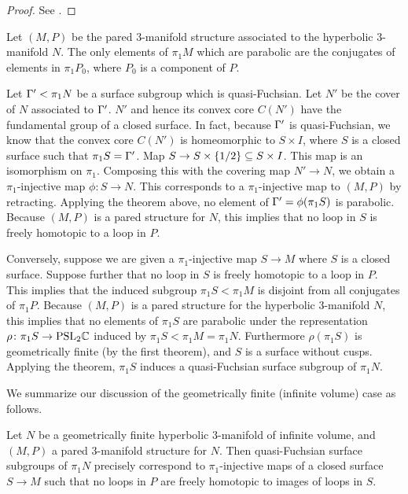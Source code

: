 \begin{proof}

See \cite[Proposition 7.1]{Mo}. %

\end{proof}


Let $(M,P)$ be the pared $3$-manifold structure associated to the hyperbolic
$3$-manifold $N$. The only elements of $\pi_1M$ which are parabolic are the
conjugates of elements in $\pi_1P_0$, where $P_0$ is a component of $P$.

Let $\Gamma' < \pi_1N$ be a surface subgroup which is quasi-Fuchsian. Let $N'$ be
the cover of $N$ associated to $\Gamma'$. $N'$ and hence its convex core $C(N')$
have the fundamental group of a closed surface. In fact, because $\Gamma'$ is
quasi-Fuchsian, we know that the convex core $C(N')$ is homeomorphic to $S
\times I$, where $S$ is a closed surface such that $\pi_1S = \Gamma'$.  Map $S \to
S \times \{1/2\} \subseteq S \times I$. This map is an isomorphism on $\pi_1$.
Composing this with the covering map $N' \to N$, we obtain a $\pi_1$-injective
map $\phi \colon S \to N$.  This corresponds to a $\pi_1$-injective map to
$(M,P)$ by retracting.  Applying the theorem above, no element of
$\Gamma'=\phi(\pi_1S)$ is parabolic.  Because $(M,P)$ is a pared structure for
$N$, this implies that no loop in $S$ is freely homotopic to a loop in $P$.

Conversely, suppose we are given a $\pi_1$-injective map $S \to M$ where $S$ is
a closed surface.  Suppose further that no loop in $S$ is freely homotopic to
a loop in $P$.  This implies that the induced subgroup $\pi_1S < \pi_1M$ is
disjoint from all conjugates of $\pi_1P$.  Because $(M,P)$ is a pared structure
for the hyperbolic $3$-manifold $N$, this implies that no elements of $\pi_1S$
are parabolic under the representation $\rho \colon \pi_1S \to \mathrm{PSL}_2\mathbb{C}$
induced by $\pi_1S < \pi_1M=\pi_1N$.  Furthermore $\rho(\pi_1S)$ is
geometrically finite (by the first theorem), and $S$ is a surface without
cusps.  Applying the theorem, $\pi_1S$ induces a quasi-Fuchsian surface
subgroup of $\pi_1N$.

We summarize our discussion of the geometrically finite (infinite volume) case
as follows.

\begin{prop}

Let $N$ be a geometrically finite hyperbolic $3$-manifold of infinite volume,
and $(M,P)$ a pared $3$-manifold structure for $N$. Then quasi-Fuchsian surface
subgroups of $\pi_1N$ precisely correspond to $\pi_1$-injective maps of
a closed surface $S \to M$ such that no loops in $P$ are freely homotopic to
images of loops in $S$.

\end{prop}

